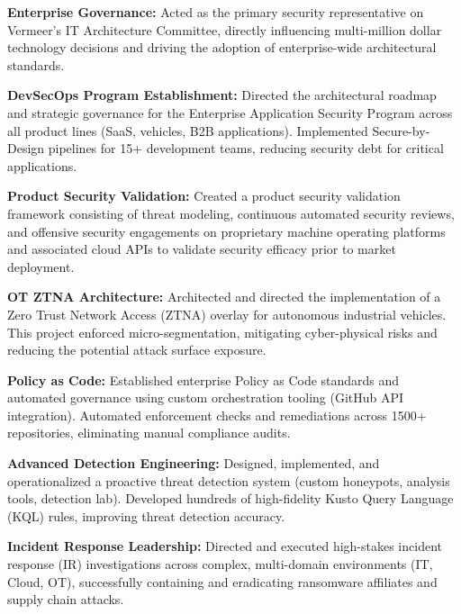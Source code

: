\item \textbf{Enterprise Governance:} Acted as the primary security representative on Vermeer's IT Architecture Committee, directly influencing multi-million dollar technology decisions and driving the adoption of enterprise-wide architectural standards.
\item \textbf{DevSecOps Program Establishment:} Directed the architectural roadmap and strategic governance for the Enterprise Application Security Program across all product lines (SaaS, vehicles, B2B applications). Implemented Secure-by-Design pipelines for 15+ development teams, reducing security debt for critical applications.
\item \textbf{Product Security Validation:} Created a product security validation framework consisting of threat modeling, continuous automated security reviews, and offensive security engagements on proprietary machine operating platforms and associated cloud APIs to validate security efficacy prior to market deployment.
\item \textbf{OT ZTNA Architecture:} Architected and directed the implementation of a Zero Trust Network Access (ZTNA) overlay for autonomous industrial vehicles. This project enforced micro-segmentation, mitigating cyber-physical risks and reducing the potential attack surface exposure.
\item \textbf{Policy as Code:} Established enterprise Policy as Code standards and automated governance using custom orchestration tooling (GitHub API integration). Automated enforcement checks and remediations across 1500+ repositories, eliminating manual compliance audits.
\item \textbf{Advanced Detection Engineering:} Designed, implemented, and operationalized a proactive threat detection system (custom honeypots, analysis tools, detection lab). Developed hundreds of high-fidelity Kusto Query Language (KQL) rules, improving threat detection accuracy.
\item \textbf{Incident Response Leadership:} Directed and executed high-stakes incident response (IR) investigations across complex, multi-domain environments (IT, Cloud, OT), successfully containing and eradicating ransomware affiliates and supply chain attacks.
